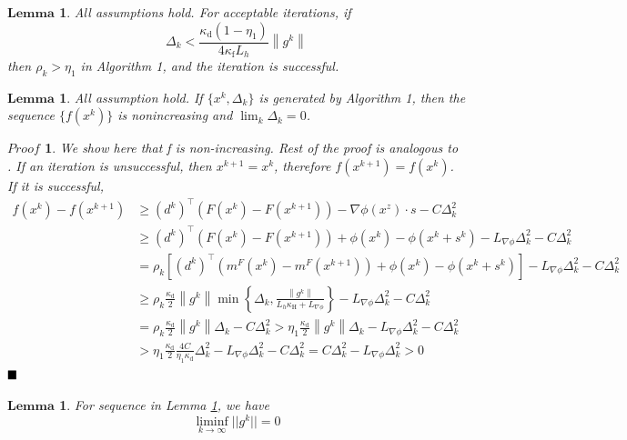 \documentclass[10pt, oneside]{article}
\newtheorem{lem}[thm]{$\mathbf{Lemma}$}
\newtheorem*{Proof}{$Proof$}
\begin{document}
\begin{lem}
All assumptions hold. For acceptable iterations, if 
\begin{equation}
\label{deltakbdd}
\Delta_{k}<\frac{\kappa_{\mathrm{d}}\left(1-\eta_{1}\right)}{4 \kappa_{\mathrm{f}} L_{h}}\left\|g^{k}\right\|
\end{equation}
then $\rho_k>\eta_1$ in Algorithm 1, and the iteration is successful. 
\end{lem}


\begin{lem}
\label{deltatozero}
All assumption hold. If $\{x^k,\Delta_k\}$ is generated by Algorithm 1, then the sequence $\{f(x^k)\}$ is nonincreasing and $\lim_k \Delta_k=0$.
\end{lem}
\begin{Proof}
We show here that f is non-increasing. Rest of the proof  is analogous to \cite{manifold}. If an iteration is unsuccessful, then $x^{k+1}=x^k$, therefore $f(x^{k+1})=f(x^k)$. If it is successful, 
$$
\begin{aligned}
f(x^{k})-f(x^{k+1}) & \geq\left(d^{k}\right)^{\top}\left(F(x^{k})-F(x^{k+1})\right)-\nabla\phi(x^z)\cdot s-C \Delta_{k}^{2} \\
&\geq \left(d^{k}\right)^{\top}\left(F(x^{k})-F(x^{k+1})\right)+\phi(x^k)-\phi(x^k+s^k)-L_{\nabla\phi}\Delta_k^2-C \Delta_{k}^{2} \\
&=\rho_{k}\left[\left(d^{k}\right)^{\top}\left(m^F(x^{k})-m^F(x^{k+1})\right)+\phi(x^k)-\phi(x^k+s^k)\right]-L_{\nabla\phi}\Delta_k^2-C \Delta_{k}^{2} \\
& \geq \rho_{k} \frac{\kappa_{\mathrm{d}}}{2}\left\|g^{k}\right\| \min \left\{\Delta_{k}, \frac{\left\|g^{k}\right\|}{L_{h} \kappa_{\mathrm{H}}+L_{\nabla\phi}}\right\}-L_{\nabla\phi}\Delta_k^2-C \Delta_{k}^{2} \\
&=\rho_{k} \frac{\kappa_{\mathrm{d}}}{2}\left\|g^{k}\right\| \Delta_{k}-C \Delta_{k}^{2}>\eta_{1} \frac{\kappa_{\mathrm{d}}}{2}\left\|g^{k}\right\| \Delta_{k}-L_{\nabla\phi}\Delta_k^2-C \Delta_{k}^{2} \\
&>\eta_{1} \frac{\kappa_{\mathrm{d}}}{2} \frac{4 C}{\eta_{1} \kappa_{\mathrm{d}}} \Delta_{k}^{2}-L_{\nabla\phi}\Delta_k^2-C \Delta_{k}^{2}=C \Delta_{k}^{2}-L_{\nabla\phi}\Delta_k^2>0
\end{aligned}
$$
$\hfill\blacksquare$
\end{Proof}

\begin{lem}
\label{liminfg}
For sequence in Lemma \ref{deltatozero}, we have 
$$
\liminf_{k\to \infty} ||g^k||=0
$$
\end{lem}
\end{document}
